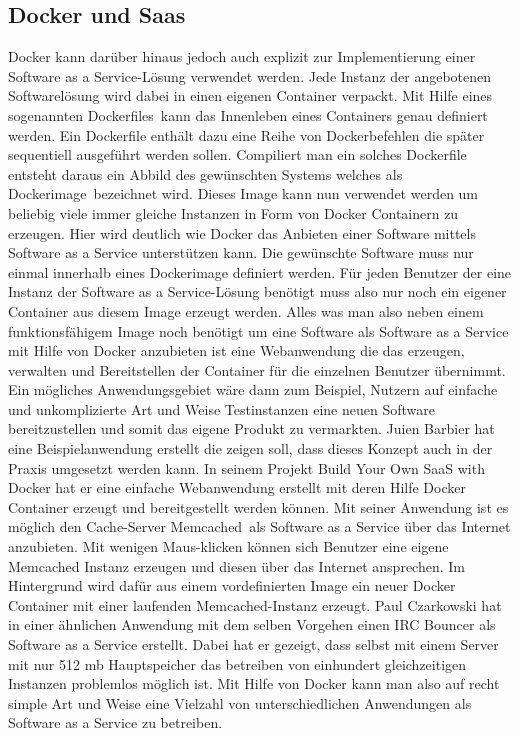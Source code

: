 \subsection{Docker und Saas}
\label{sec:docker_und_saas}
Docker kann darüber hinaus jedoch auch explizit zur Implementierung einer Software as a Service-Lösung verwendet werden. Jede Instanz der angebotenen Softwarelösung wird dabei in einen eigenen Container verpackt. Mit Hilfe eines sogenannten \grq Dockerfiles\grq\ kann das Innenleben eines Containers genau definiert werden. Ein Dockerfile enthält dazu eine Reihe von Dockerbefehlen die später sequentiell ausgeführt werden sollen. Compiliert man ein solches Dockerfile entsteht daraus ein Abbild des gewünschten Systems welches als \grq Dockerimage\grq\ bezeichnet wird.
Dieses Image kann nun verwendet werden um beliebig viele immer gleiche Instanzen in Form von Docker Containern zu erzeugen.
Hier wird deutlich wie Docker das Anbieten einer Software mittels Software as a Service unterstützen kann.
Die gewünschte Software muss nur einmal innerhalb eines Dockerimage definiert werden. Für jeden Benutzer der eine Instanz der Software as a Service-Lösung benötigt muss also nur noch ein eigener Container aus diesem Image erzeugt werden. Alles was man also neben einem funktionsfähigem Image noch benötigt um eine Software als Software as a Service mit Hilfe von Docker anzubieten ist eine Webanwendung die das erzeugen, verwalten und Bereitstellen der Container für die einzelnen Benutzer übernimmt.
Ein mögliches Anwendungsgebiet wäre dann zum Beispiel, Nutzern auf einfache und unkomplizierte Art und Weise Testinstanzen eine neuen Software bereitzustellen und somit das eigene Produkt zu vermarkten.
Juien Barbier hat eine Beispielanwendung erstellt die zeigen soll, dass dieses Konzept auch in der Praxis umgesetzt werden kann.
In seinem Projekt \glqq Build Your Own SaaS with Docker\grqq \cite{barbier_build_2013} hat er eine einfache Webanwendung erstellt mit deren Hilfe Docker Container erzeugt und bereitgestellt werden können. Mit seiner Anwendung ist es möglich den Cache-Server \grq Memcached\grq\ als Software as a Service über das Internet anzubieten. Mit wenigen Maus-klicken können sich Benutzer eine eigene Memcached Instanz erzeugen und diesen über das Internet ansprechen.
Im Hintergrund wird dafür aus einem vordefinierten Image ein neuer Docker Container mit einer laufenden Memcached-Instanz erzeugt.
Paul Czarkowski hat in einer ähnlichen Anwendung mit dem selben Vorgehen einen  IRC Bouncer als Software as a Service erstellt. Dabei hat er gezeigt, dass selbst mit einem Server mit nur 512 mb Hauptspeicher das betreiben von einhundert gleichzeitigen Instanzen problemlos möglich ist. \cite{czarkowski_i_????}
Mit Hilfe von Docker kann man also auf recht simple Art und Weise eine Vielzahl von unterschiedlichen Anwendungen als Software as a Service zu betreiben.

